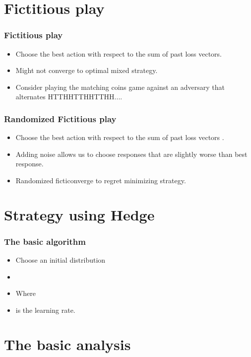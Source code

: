 \documentclass[handout]{beamer}
\begin{document}
\section{Fictitious play}

\begin{frame}
\frametitle{Fictitious play}
\begin{itemize}
\item Choose the best action with respect to the sum of past loss vectors.
\item Might not converge to optimal mixed strategy.
\item Consider playing the matching coins game against an adversary
  that alternates HTTHHTTHHTTHH....
\end{itemize}
\end{frame}

\begin{frame}
\frametitle{Randomized Fictitious play}
\begin{itemize}
\item Choose the best action with respect to the sum of past loss
  vectors .
\item Adding noise allows us to choose responses that are slightly
  worse than best response.
\item {} Randomized ficticonverge to regret minimizing strategy.
\end{itemize}
\end{frame}


\section{Strategy using Hedge}

\begin{frame}
\frametitle{The basic algorithm}
\begin{itemize}
\item Choose an initial distribution 
\item {}
\item Where 
\item {} is the learning rate.
\end{itemize}
\end{frame}

\section{The basic analysis}
\end{document}
